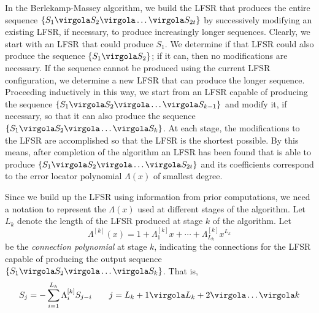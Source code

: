 In the Berlekamp-Massey algorithm, we build the LFSR that produces the entire sequence \( \{S_1\virgola S_2\virgola \ldots \virgola S_{2t} \}\) by successively modifying an existing LFSR, if necessary, to produce increasingly longer sequences. Clearly, we start with an LFSR that could produce \(S_1\). We determine if that LFSR could also produce the sequence \( \{S_1\virgola S_2\}\); if it can, then no modifications are necessary. If the sequence cannot be produced using the current LFSR configuration, we determine a new LFSR that can produce the longer sequence. Proceeding inductively in this way, we start from an LFSR capable of producing the sequence \( \{S_1\virgola S_2\virgola \ldots \virgola S_{k-1} \}\) and modify it, if necessary, so that it can also produce the sequence \( \{S_1\virgola S_2\virgola \ldots \virgola S_{k} \}\). At each stage, the modifications to the LFSR are accomplished so that the LFSR is the shortest possible. By this means, after completion of the algorithm an LFSR has been found that is able to produce \( \{S_1\virgola S_2\virgola \ldots \virgola S_{2t} \}\) and its coefficients correspond to the error locator polynomial \(\Lambda(x)\) of smallest degree.

Since we build up the LFSR using information from prior computations, we need a notation to represent the \(\Lambda(x)\) used at different stages of the algorithm. Let \(L_k\) denote the length of the LFSR produced at stage \(k\) of the algorithm. Let
\begin{equation}
\Lambda^{[k]}(x) = 1 + \Lambda_1^{[k]}x + \cdots + \Lambda_{L_k}^{[k]}x^{L_k}
\end{equation}
be the \emph{connection polynomial} at stage \(k\), indicating the connections for the LFSR capable of producing the output sequence \(\{S_1\virgola S_2\virgola \ldots \virgola S_{k} \}\). That is,
\begin{equation}
S_j = - \sum_{i = 1}^{L_k} {\Lambda_i^{[k]} S_{j-i}} \qquad j = L_k+1 \virgola L_k + 2 \virgola \ldots \virgola k
\end{equation}

